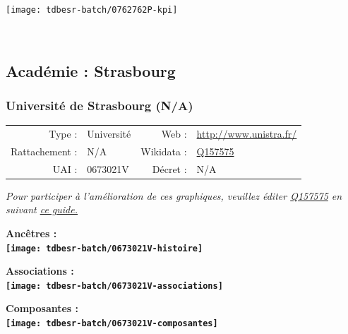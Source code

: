 \documentclass[12pt,french,]{article}
\begin{document}
\begin{center}\texttt{[image: tdbesr-batch/0762762P-kpi]} \end{center}\checkoddpage

\ifoddpage ~\newpage \fi   

\hypertarget{acaduxe9mie-strasbourg}{%
\subsection{Académie : Strasbourg}\label{acaduxe9mie-strasbourg}}

\hypertarget{universituxe9-de-strasbourg-na}{%
\subsubsection{Université de Strasbourg
(N/A)}\label{universituxe9-de-strasbourg-na}}

\begin{tabular*}{\textwidth}{rp{5cm}rl}  
\hline  
Type : & Université & Web : &\href{http://www.unistra.fr/}{http://www.unistra.fr/} \\  
Rattachement : & N/A & Wikidata : & \href{https://www.wikidata.org/entity/Q157575}{Q157575} \\  
UAI : & 0673021V & Décret : & N/A \\  
\hline  
\end{tabular*}

\textit{\scriptsize Pour participer à l'amélioration de ces graphiques, veuillez éditer  \href{https://www.wikidata.org/entity/Q157575}{Q157575}  en suivant \href{https://github.com/cpesr/wikidataESR/blob/master/Rmd/wikidataESR.md}{ce guide.}}

\vspace{1cm}  
\begin{minipage}[b]{0.50\textwidth}\begin{center} \bf Ancêtres : \\  
\texttt{[image: tdbesr-batch/0673021V-histoire]} \end{center}\end{minipage}\begin{minipage}[b]{0.50\textwidth}\begin{center} \bf Associations : \\  
\texttt{[image: tdbesr-batch/0673021V-associations]} \end{center}\end{minipage}

\hrulefill

\begin{center} \bf Composantes : \\  
\texttt{[image: tdbesr-batch/0673021V-composantes]} \end{center}
\end{document}
